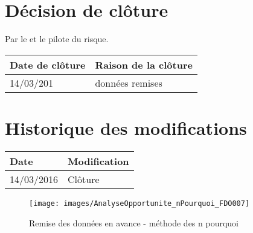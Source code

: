 \section*{Décision de clôture}
Par le \CP{} et le pilote du risque.
\begin{table}[H]
\centering
	\begin{tabularx}{16.8cm}{|X|X|}
	\hline
	\rowcolor{gray!40} Date de clôture & Raison de la clôture \\
	\hline
	 14/03/201 & données remises \\
	\hline
	\end{tabularx}
\end{table}

\section*{Historique des modifications}
\begin{table}[H]
\centering
	\begin{tabularx}{16.8cm}{|X|X|}
	\hline
	\rowcolor{gray!40} Date & Modification \\
	\hline
	 14/03/2016 & Clôture\\
	\hline
	\end{tabularx}
\end{table}
\newpage


\begin{figure}
	\centering
	\texttt{[image: images/AnalyseOpportunite\_nPourquoi\_FDO007]}
	\caption{\label{opportinute avance donnees} Remise des données en avance - méthode des n pourquoi}
\end{figure}